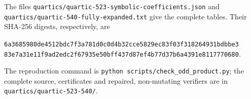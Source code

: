 The files \nolinkurl{quartics/quartic-523-symbolic-coefficients.json}
and \nolinkurl{quartics/quartic-540-fully-expanded.txt} give the complete
tables. Their SHA-256 digests, respectively, are
\begin{center}\small
\nolinkurl{6a3685980de4512bdc7f3a781d0c0d4b32cce5829ec83f03f318264931bdbbe3}\\
\nolinkurl{83e7a31e11f9ad2edc2f67935e50bff437d87ef4b77d37b6a4391e8117770680}.
\end{center}
The reproduction command is
\nolinkurl{python scripts/check_odd_product.py}; the complete source,
certificates and repaired, non-mutating verifiers are in
\nolinkurl{quartics/quartic-523-540/}.

